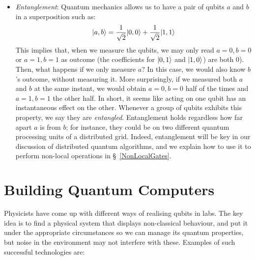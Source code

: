 \begin{itemize}
  \item \textit{Entanglement}: Quantum mechanics allows us to have a pair of qubits \(a\) and \(b\) in a superposition such as: \[\vert a,b \rangle = \frac{1}{\sqrt{2}}\vert 0,0 \rangle + \frac{1}{\sqrt{2}}\vert 1,1 \rangle\] This implies that, when we measure the qubits, we may only read \(a=0, b=0\) or \(a=1, b=1\) as outcome (the coefficients for \(\vert 0,1 \rangle\) and \(\vert 1,0 \rangle\)) are both \(0\)). Then, what happens if we only measure \(a\)? In this case, we would also know \(b\)'s outcome, without measuring it. More surprisingly, if we measured both \(a\) and \(b\) at the same instant, we would obtain \(a=0, b=0\) half of the times and \(a=1, b=1\) the other half. In short, it seems like acting on one qubit has an instantaneous effect on the other. Whenever a group of qubits exhibits this property, we say they are \textit{entangled}. Entanglement holds regardless how far apart \(a\) is from \(b\); for instance, they could be on two different quantum processing units of a distributed grid. Indeed, entanglement will be key in our discussion of distributed quantum algorithms, and we explain how to use it to perform non-local operations in \S~\ref{NonLocalGates}.

\end{itemize}


\section{Building Quantum Computers}

Physicists have come up with different ways of realising qubits in labs. The key idea is to find a physical system that displays non-classical behaviour, and put it under the appropriate circumstances so we can manage its quantum properties, but noise in the environment may not interfere with these. Examples of such successful technologies are:

